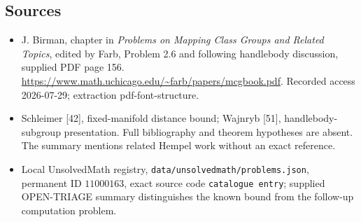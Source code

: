 \documentclass[11pt]{article}
\begin{document}
\subsection{Sources}
\begin{itemize}
\item J. Birman, chapter in \emph{Problems on Mapping Class Groups and Related Topics}, edited by Farb, Problem 2.6 and following handlebody discussion, supplied PDF page 156. \url{https://www.math.uchicago.edu/~farb/papers/mcgbook.pdf}. Recorded access 2026-07-29; extraction pdf-font-structure.
\item Schleimer [42], fixed-manifold distance bound; Wajnryb [51], handlebody-subgroup presentation. Full bibliography and theorem hypotheses are absent. The summary mentions related Hempel work without an exact reference.
\item Local UnsolvedMath registry, \texttt{data/unsolvedmath/problems.json}, permanent ID \(11000163\), exact source code \texttt{catalogue entry}; supplied OPEN-TRIAGE summary distinguishes the known bound from the follow-up computation problem.
\end{itemize}
\end{document}
